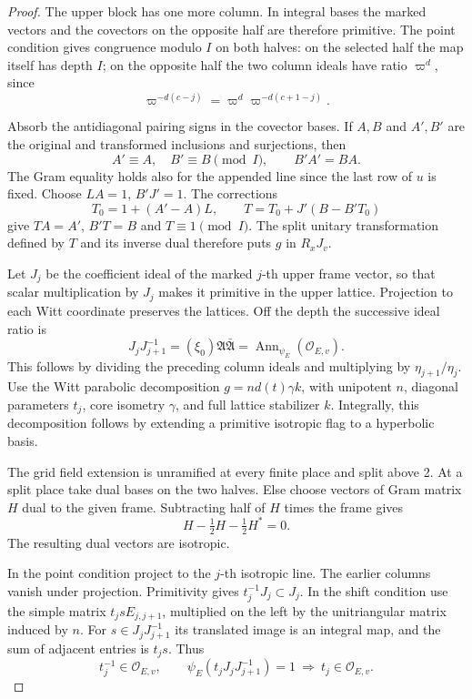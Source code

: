 \begin{proof}
The upper block has one more column. In integral bases the marked
vectors and the covectors on the opposite half are therefore
primitive. The point condition gives congruence modulo \(I\) on
both halves: on the selected half the map itself has depth \(I\);
on the opposite half the two column ideals have ratio \(\varpi^d\),
since
\[
  \varpi^{-d(c-j)}
        =\varpi^d\varpi^{-d(c+1-j)} .
\]

Absorb the antidiagonal pairing signs in the covector bases. If
\(A,B\) and \(A',B'\) are the original and transformed inclusions
and surjections, then
\[
 A'\equiv A,\quad B'\equiv B\pmod I,\qquad B'A'=BA.
\]
The Gram equality holds also for the appended line since the last
row of \(u\) is fixed. Choose \(L A=1\), \(B'J'=1\). The corrections
\[
 T_0=1+(A'-A)L,\qquad T=T_0+J'(B-B'T_0)
\]
give \(TA=A'\), \(B'T=B\) and \(T\equiv1\pmod I\).
The split unitary transformation defined by \(T\) and its inverse
dual therefore puts \(g\) in \(R_x J_v\).

Let \(J_j\) be the coefficient ideal of the marked \(j\)-th upper
frame vector, so that scalar multiplication by \(J_j\) makes it
primitive in the upper lattice. Projection to each Witt coordinate
preserves the lattices. Off the depth the successive ideal ratio is
\[
 J_j J_{j+1}^{-1}=(\xi_0)\mathfrak A\bar{\mathfrak A}
                    =\operatorname{Ann}_{\psi_E}(\mathcal O_{E,v}).
\]
This follows by dividing the preceding column ideals and multiplying
by \(\eta_{j+1}/\eta_j\). Use the Witt parabolic decomposition
\(g=n d(t)\gamma k\), with unipotent \(n\), diagonal parameters
\(t_j\), core isometry \(\gamma\), and full lattice stabilizer
\(k\). Integrally, this decomposition follows by extending a
primitive isotropic flag to a hyperbolic basis.

The grid field extension is unramified at every finite place and split above 2. At a split place take dual bases on the two halves. Else choose vectors of Gram matrix \(H\) dual to the given frame. Subtracting half of \(H\) times the frame gives
\[
 H-\tfrac12 H-\tfrac12 H^*=0.
\]
The resulting dual vectors are isotropic.

In the point condition project to the \(j\)-th isotropic line.
The earlier columns vanish under projection. Primitivity gives
\(t_j^{-1}J_j\subset J_j\). In the shift condition use the simple
matrix \(t_j s E_{j,j+1}\), multiplied on the left by the
unitriangular matrix induced by \(n\). For \(s\in J_j J_{j+1}^{-1}\)
its translated image is an integral map, and the sum of adjacent
entries is \(t_j s\). Thus
\[
 t_j^{-1}\in\mathcal O_{E,v},\qquad
 \psi_E(t_j J_jJ_{j+1}^{-1})=1
           \ \Longrightarrow\ t_j\in\mathcal O_{E,v}.
\]


\end{proof}
